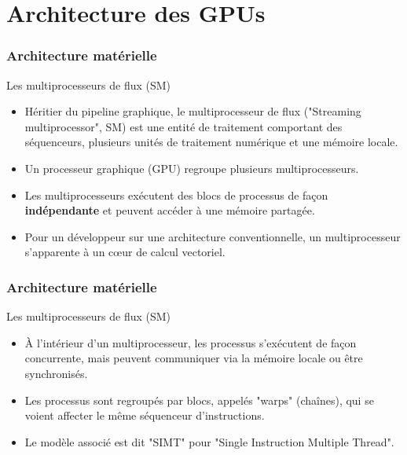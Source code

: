 \section{Architecture des GPUs}
\begin{frame}
    \frametitle{Architecture matérielle}
\begin{block}{Les multiprocesseurs de flux (SM)}
   \begin{itemize}
    \item<+-> Héritier du pipeline graphique, le multiprocesseur de flux ("Streaming multiprocessor", SM) 
    est une entité de traitement comportant des séquenceurs, plusieurs unités de traitement numérique et une mémoire locale.
    \item<+-> Un processeur graphique (GPU) regroupe plusieurs multiprocesseurs. 
    \item<+-> Les multiprocesseurs exécutent des blocs de processus de façon \textbf{indépendante} et peuvent accéder à
    une mémoire partagée.
    \item<+-> Pour un développeur sur une architecture conventionnelle, un multiprocesseur s'apparente à un c{\oe}ur de calcul
    vectoriel.
   \end{itemize} 
\end{block}
    

\end{frame}
\begin{frame}
    \frametitle{Architecture matérielle}
\begin{block}{Les multiprocesseurs de flux (SM)}
   \begin{itemize}
    \item<+->À l'intérieur d'un multiprocesseur, les processus s'exécutent de façon concurrente, mais peuvent communiquer
    via la mémoire locale ou être synchronisés.
    \item<+->Les processus sont regroupés par blocs, appelés "warps" (chaînes), qui se voient affecter le même séquenceur 
    d'instructions.
    \item<+->Le modèle associé est dit "SIMT" pour "Single Instruction Multiple Thread".
   \end{itemize} 
\end{block}
\end{frame}
